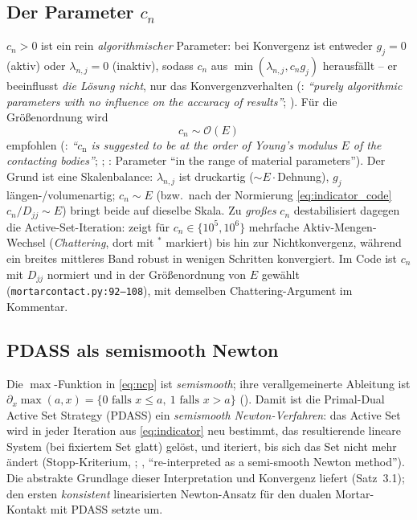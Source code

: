 \documentclass[a4paper,11pt]{article}
\def\tilde#1{#1}%
\newcommand{\file}[1]{\texttt{\small #1}}
\begin{document}
\subsection{Der Parameter $c_n$}
$c_n>0$ ist ein rein \emph{algorithmischer} Parameter: bei Konvergenz ist entweder $\tilde g_j=0$
(aktiv) oder $\lambda_{n,j}=0$ (inaktiv), sodass $c_n$ aus $\min(\lambda_{n,j},c_n\tilde g_j)$
herausfällt -- er beeinflusst \emph{die Lösung nicht}, nur das Konvergenzverhalten
(\citealp[S.~565]{gitterle}: \emph{``purely algorithmic parameters with no influence on the accuracy of
results''}; \citealp[S.~38]{farah}). Für die Größenordnung wird
\begin{equation}
c_n \sim \mathcal O(E)
\end{equation}
empfohlen (\citealp[S.~1367]{poppgeewall2009}: \emph{``$c_{\mathrm n}$ is suggested to be at the order
of Young's modulus $E$ of the contacting bodies''}; \citealp[S.~38]{farah}; \citealp[S.~565]{gitterle}:
Parameter ``in the range of material parameters''). Der Grund ist eine Skalenbalance: $\lambda_{n,j}$
ist druckartig ($\sim E\cdot$Dehnung), $\tilde g_j$ längen-/volumenartig; $c_n\sim E$ (bzw.\ nach der
Normierung \eqref{eq:indicator_code} $c_n/\tilde D_{jj}\sim E$) bringt beide auf dieselbe Skala. Zu
\emph{großes} $c_n$ destabilisiert dagegen die Active-Set-Iteration: \citet[Tab.~I, S.~565]{gitterle}
zeigt für $c_n\in\{10^5,10^6\}$ mehrfache Aktiv-Mengen-Wechsel (\emph{Chattering}, dort mit $^*$
markiert) bis hin zur Nichtkonvergenz, während ein breites mittleres Band robust in wenigen Schritten
konvergiert. Im Code ist $c_n$ mit $\tilde D_{jj}$ normiert und in der Größenordnung von $E$ gewählt
(\file{mortarcontact.py:\allowbreak{}92--108}), mit demselben Chattering-Argument im Kommentar.

\subsection{PDASS als semismooth Newton}
Die $\max$-Funktion in \eqref{eq:ncp} ist \emph{semismooth}; ihre verallgemeinerte Ableitung ist
$\partial_x\max(a,x)=\{0 \text{ falls } x\le a,\ 1 \text{ falls } x>a\}$ (\citealp[Gl.~(64)]{gitterle}).
Damit ist die Primal-Dual Active Set Strategy (PDASS) ein \emph{semismooth Newton-Verfahren}: das
Active Set wird in jeder Iteration aus \eqref{eq:indicator} neu bestimmt, das resultierende lineare
System (bei fixiertem Set glatt) gelöst, und iteriert, bis sich das Set nicht mehr ändert
(Stopp-Kriterium, \citealp[S.~3153]{hueber2005}; \citealp[Abschn.~3.5.2]{farah}, ``re-interpreted as a
semi-smooth Newton method''). Die abstrakte Grundlage dieser Interpretation und Konvergenz liefert
\citet{hik2002} (Satz~3.1); den ersten \emph{konsistent} linearisierten
Newton-Ansatz für den dualen Mortar-Kontakt mit PDASS setzte \citet[Gl.~(65)/(67)]{poppgeewall2009} um.
\end{document}
